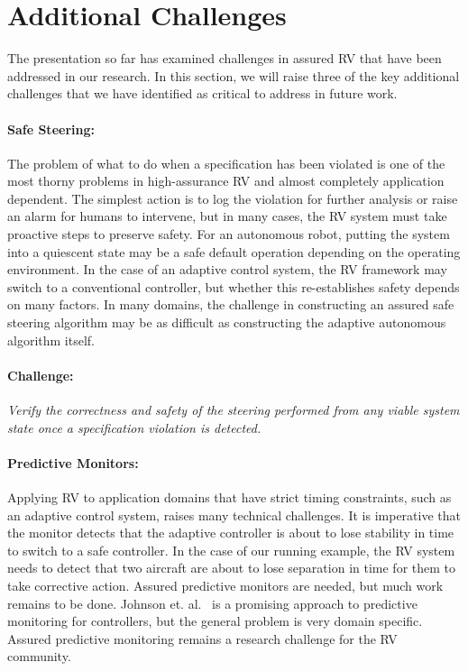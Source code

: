 \section{Additional Challenges }\label{sec:future} 
The presentation so far has examined challenges in assured RV that
have been addressed in our research. In this section, we will
raise three of the key additional challenges that we have identified
as critical to address in future work.

\paragraph{Safe Steering:} The problem of what to do when a
specification has been violated is one of the most thorny problems in
high-assurance RV and almost completely application dependent. The
simplest action is to log the violation for further analysis or raise
an alarm for humans to intervene, but in many cases, the RV system must
take proactive steps to preserve safety. For an autonomous robot,
putting the system into a quiescent state may be a safe default
operation depending on the operating environment.  In the case of an
adaptive control system, the RV framework may switch to a conventional
controller, but whether this re-establishes safety depends on many
factors.  In many domains, the challenge in constructing an assured
safe steering algorithm may be as difficult as constructing the
adaptive autonomous algorithm itself.

\paragraph{Challenge:}  \emph{Verify the correctness and safety of the
steering performed  from any viable system state once a specification violation is detected.}
 

\paragraph{Predictive Monitors:} Applying RV to application domains
that have strict timing constraints, such as an adaptive control
system, raises many technical challenges.  It is imperative that the
monitor detects that the adaptive controller is about to lose
stability in time to switch to a safe controller. In the case of our
running example, the RV system needs to detect that two aircraft are
about to lose separation in time for them to take corrective action.
Assured predictive monitors are needed, but much work remains to be
done.  Johnson et. al.~\cite{johnson2015tecs} is a promising approach
to predictive monitoring for controllers, but the general problem is
very domain specific. Assured predictive monitoring remains a research
challenge for the RV community.

